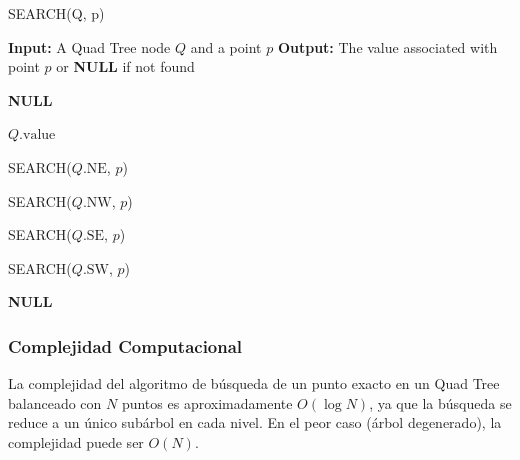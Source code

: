 \documentclass[9pt,a4paper,twoside]{rho-class/rho}
\begin{document}
            \begin{algorithm}
                \caption{SEARCH(Q, p)}
                \begin{algorithmic}[1]
                \Statex \textbf{Input:} A Quad Tree node $Q$ and a point $p$
                \Statex \textbf{Output:} The value associated with point $p$ or \textbf{NULL} if not found
                
                    \State \Return \textbf{NULL} 
                \EndIf
                
                    \State \Return $Q.\text{value}$ 
                \EndIf
                
                    \State \Return SEARCH($Q.\text{NE}$, $p$)
                \EndIf
                
                    \State \Return SEARCH($Q.\text{NW}$, $p$)
                \EndIf
                
                    \State \Return SEARCH($Q.\text{SE}$, $p$)
                \EndIf
                
                    \State \Return SEARCH($Q.\text{SW}$, $p$)
                \EndIf
                
                \State \Return \textbf{NULL} 
                
                \end{algorithmic}
            \end{algorithm}
            \subsubsection{Complejidad Computacional}
                La complejidad del algoritmo de búsqueda de un punto exacto en un Quad Tree balanceado con $N$ puntos es aproximadamente $O(\log N)$, ya que la búsqueda se reduce a un único subárbol en cada nivel. En el peor caso (árbol degenerado), la complejidad puede ser $O(N)$.
\end{document}
